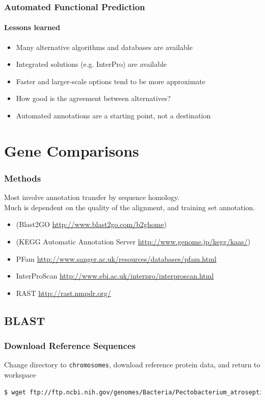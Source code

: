     \begin{frame}
      \frametitle{Automated Functional Prediction}   
      \framesubtitle{Lessons learned}   
      \begin{itemize}
        \item Many alternative algorithms and databases are available 
        \item Integrated solutions (e.g. InterPro) are available
        \item Faster and larger-scale options tend to be more approximate
        \item How good is the agreement between alternatives?
        \item Automated annotations are a starting point, not a destination
      \end{itemize}
    \end{frame}

  \section{Gene Comparisons}
    \begin{frame}
      \frametitle{Methods}   
      Most involve annotation transfer by sequence homology. \\
      Much is dependent on the quality of the alignment, and training set annotation.
      \begin{itemize}
        \item (Blast2GO \url{http://www.blast2go.com/b2ghome})
        \item (KEGG Automatic Annotation Server \url{http://www.genome.jp/kegg/kaas/})
        \item PFam \url{http://www.sanger.ac.uk/resources/databases/pfam.html}
        \item InterProScan \url{http://www.ebi.ac.uk/interpro/interproscan.html}
        \item RAST \url{http://rast.nmpdr.org/}
      \end{itemize}
    \end{frame}

    \subsection{BLAST}
  \begin{frame}[fragile]
    \frametitle{Download Reference Sequences}
    Change directory to \texttt{chromosomes}, download reference protein data, and return to workspace
\begin{lstlisting}[language=bash]
$ wget ftp://ftp.ncbi.nih.gov/genomes/Bacteria/Pectobacterium_atrosepticum_SCRI1043_uid57957/NC_004547.faa
\end{lstlisting}
\end{frame}

